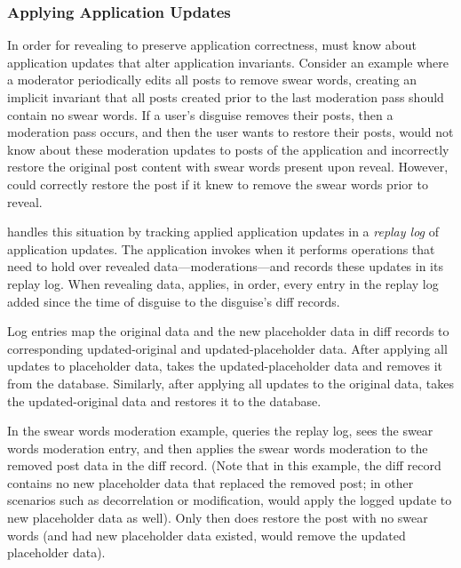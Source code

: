 %
\subsubsection{Applying Application Updates}
In order for revealing to preserve application correctness, \sys must know about
application updates that alter application invariants.
%
Consider an example where a moderator periodically edits all posts to remove
swear words, creating an implicit invariant that all posts created prior to the
last moderation pass should contain no swear words.
%
If a user's disguise removes their posts, then a moderation pass occurs, and
then the user wants to restore their posts, \sys would not know about these
moderation updates to posts of the application and incorrectly restore the
original post content with swear words present upon reveal.
%
However, \sys could correctly restore the post if it knew to remove the swear
words prior to reveal.
%
%
%

\sys handles this situation by tracking applied application updates in a
\emph{replay log} of application updates.
%
The application invokes \sys when it performs operations that need to hold
over revealed data---\eg moderations---and \sys records these updates in its replay
log.
%
When revealing data, \sys applies, in order, every entry in the replay log
added since the time of disguise to the disguise's diff records.  
%

%
Log entries map the original data and the new placeholder data in diff records
to corresponding updated-original and updated-placeholder data. 
%
After applying all updates to placeholder data, \sys takes the
updated-placeholder data and removes it from the database.
%
Similarly, after applying all updates to the original data, \sys takes the
updated-original data and restores it to the database.

%
In the swear words moderation example, \sys queries the replay log, sees
the swear words moderation entry, and then applies the swear words moderation to
the removed post data in the diff record. (Note that in this example, the diff
record contains no new placeholder data that replaced the removed post; in other
scenarios such as decorrelation or modification, \sys would apply the logged
update to new placeholder data as well). Only then does \sys restore the post
with no swear words (and had new placeholder data existed, \sys would remove the
updated placeholder data).

